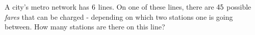 
%
%
%
%      
% 
% 
%   



\gcalcexpr[0]

\question[2] A city's metro network has $6$ lines. On one of these lines, there are $45$ 
possible \textit{fares} that can be charged - depending on which two stations one is going between.
 How many stations are there on this line? 

